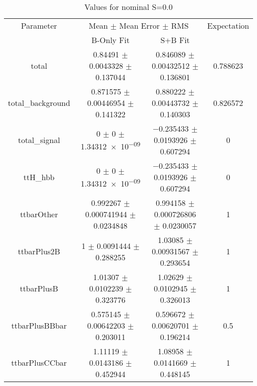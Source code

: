 \begin{table}
\centering
\caption{Values for nominal S=0.0}
\begin{tabular}{cccc}
\toprule
Parameter & \multicolumn{2}{c}{Mean $\pm$ Mean Error $\pm$ RMS} & Expectation\\
 & B-Only Fit & S+B Fit & \\
\midrule
total & \num{0.84491} $\pm$ \num{0.0043328} $\pm$ \num{0.137044} & \num{0.846089} $\pm$ \num{0.00432512} $\pm$ \num{0.136801} & \num{0.788623}\\
total\_background & \num{0.871575} $\pm$ \num{0.00446954} $\pm$ \num{0.141322} & \num{0.880222} $\pm$ \num{0.00443732} $\pm$ \num{0.140303} & \num{0.826572}\\
total\_signal & \num{0} $\pm$ \num{0} $\pm$ \num{1.34312e-09} & \num{-0.235433} $\pm$ \num{0.0193926} $\pm$ \num{0.607294} & \num{0}\\
ttH\_hbb & \num{0} $\pm$ \num{0} $\pm$ \num{1.34312e-09} & \num{-0.235433} $\pm$ \num{0.0193926} $\pm$ \num{0.607294} & \num{0}\\
ttbarOther & \num{0.992267} $\pm$ \num{0.000741944} $\pm$ \num{0.0234848} & \num{0.994158} $\pm$ \num{0.000726806} $\pm$ \num{0.0230057} & \num{1}\\
ttbarPlus2B & \num{1} $\pm$ \num{0.0091444} $\pm$ \num{0.288255} & \num{1.03085} $\pm$ \num{0.00931567} $\pm$ \num{0.293654} & \num{1}\\
ttbarPlusB & \num{1.01307} $\pm$ \num{0.0102239} $\pm$ \num{0.323776} & \num{1.02629} $\pm$ \num{0.0102945} $\pm$ \num{0.326013} & \num{1}\\
ttbarPlusBBbar & \num{0.575145} $\pm$ \num{0.00642203} $\pm$ \num{0.203011} & \num{0.596672} $\pm$ \num{0.00620701} $\pm$ \num{0.196214} & \num{0.5}\\
ttbarPlusCCbar & \num{1.11119} $\pm$ \num{0.0143186} $\pm$ \num{0.452944} & \num{1.08958} $\pm$ \num{0.0141669} $\pm$ \num{0.448145} & \num{1}\\
\bottomrule
\end{tabular}
\end{table}